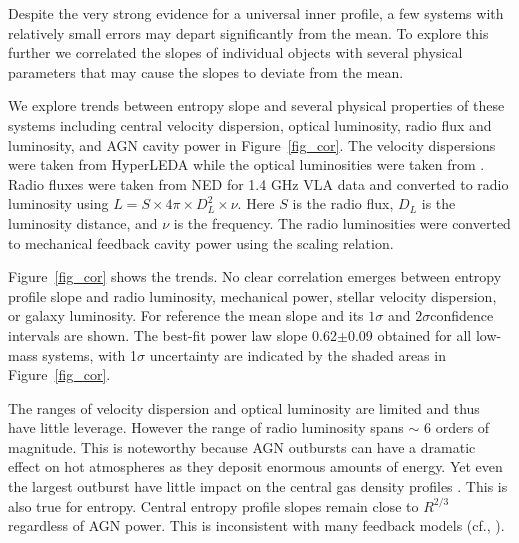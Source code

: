 \documentclass[apjl]{emulateapj}
\begin{document}
Despite the very strong evidence for a universal inner profile, a few systems with relatively small errors may depart significantly from the mean. To explore this further we correlated the slopes of individual objects with several physical parameters that may cause the slopes to deviate from the mean.  

We explore trends between entropy slope and several physical properties of these systems including  central velocity dispersion, optical luminosity, radio flux and luminosity, and AGN cavity power in Figure~\ref{fig_cor}. The velocity dispersions were taken from HyperLEDA while the optical luminosities were taken from \citet{Ellis:06, Nagino:09}.  Radio fluxes were taken from NED for 1.4 GHz VLA data and converted to radio luminosity using $L = S \times 4\pi \times D_L^2 \times \nu$.  Here $S$ is the radio flux, $D_L$ is the luminosity distance, and $\nu$ is the frequency.  The radio luminosities were converted to mechanical feedback cavity power using the \citet{Cavagnolo:10} scaling relation.  

Figure~\ref{fig_cor} shows the trends.  No clear correlation emerges between entropy profile slope and radio luminosity, mechanical power, stellar velocity dispersion, or galaxy luminosity.  For reference the mean slope and its $1\sigma$ and $2\sigma$confidence intervals are shown.   The best-fit power law slope 0.62$\pm$0.09 obtained for all low-mass systems, with 1$\sigma$ uncertainty are indicated by the shaded areas in Figure~\ref{fig_cor}.

The ranges of velocity dispersion and optical luminosity are limited and thus have little leverage.  However the range of radio luminosity spans $\sim$ 6 orders of magnitude. This is noteworthy because AGN outbursts can have a dramatic effect on hot atmospheres as they deposit enormous amounts of energy.  Yet even the largest outburst have little impact on the central gas density profiles \citep{Hogan:17a,McNamara:16}.  This is also true for entropy.  Central entropy profile slopes remain close to $R^{2/3}$ regardless of AGN power.  This is inconsistent with many feedback models (cf., \citet{Hogan:17a, Pulido:17}).

\end{document}
